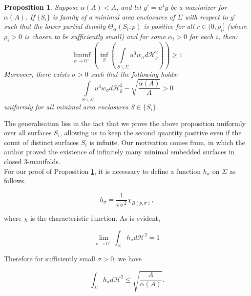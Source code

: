 \documentclass{amsart}
\newcommand{\hm}{\mathscr{H}}
\newtheorem{proposition}{Proposition}
\theoremstyle{named}
\begin{document}
\begin{proposition} \label{prop:Prop_1}
    Suppose $\alpha ( A )  < A$, and let $g' = u^{4}g$ be a maximizer for $\alpha ( A )$. If $\{S_i\}$ is family of a minimal area enclosures of $\Sigma$ with respect to $g'$ such that the lower partial density $\Theta_{\alpha}(S_i,p)$ is positive for all $r \in (0,\rho_i]$ (where $\rho_i > 0$ is chosen to be sufficiently small) and for some $\alpha_i > 0$ for each $i$, then: 
    \begin{equation} \nonumber
        \liminf\limits_{\sigma \xrightarrow{} 0^{+}} \left( \inf\limits_{S} \left(  \int\limits_{S\backslash\Sigma} u^{3}w_{\sigma}d\hm^{2}_{g} \right) \right) \geq 1
    \end{equation}
    Moreover, there exists $\sigma > 0$ such that the following holds:
    \begin{equation} \label{eqn: prop1_ineq}
         \int\limits_{S\backslash\Sigma} u^{3}w_{\sigma}d\hm^{2}_{g} - \sqrt{\frac{\alpha(A)}{A}} > 0
    \end{equation}
    uniformly for all minimal area enclosures $S \in \{S_i\}$.
\end{proposition}

The generalisation lies in the fact that we prove the above proposition uniformly over all surfaces $S_i$, allowing us to keep the second quantity positive even if the count of distinct surfaces $S_i$ is infinite. Our motivation comes from\cite{song}, in which the author proved the existence of infinitely many minimal embedded surfaces in closed 3-manifolds. \\ 


For our proof of Proposition \ref{prop:Prop_1}, it is necessary to define a function $h_{\sigma}$ on $\Sigma$ as follows. \cite{jeff}

\begin{equation}
    h_{\sigma} = \frac{1}{\pi \sigma^{2}}\chi_{B(p,\sigma)},
\end{equation}

where $\chi$ is the characteristic function. As is evident,

\begin{equation}
    \lim\limits_{\sigma \xrightarrow{} 0^{+}}\int_{\Sigma}h_{\sigma}d\hm^{2} = 1
\end{equation}

Therefore for sufficiently small $\sigma > 0$, we have 

\begin{equation} \label{eqn3}
   \int_{\Sigma}h_{\sigma}d\hm^{2} \leq \sqrt{\frac{A}{\alpha(A)}}.
\end{equation}
\end{document}
